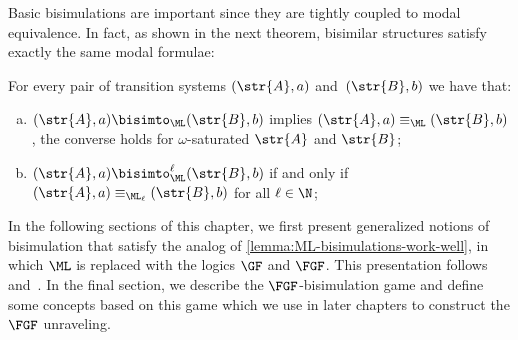 \noindent
Basic bisimulations are important since they are tightly coupled to modal equivalence.
In fact, as shown in the next theorem, bisimilar structures satisfy exactly the same modal formulae:
\begin{lemma}\label{lemma:ML-bisimulations-work-well}
For every pair of transition systems $(\str{A}, a)$ and~$(\str{B}, b)$ we have that:
\begin{enumerate}[(a)]
\item $(\str{A}, a) \bisimto_{\ML} (\str{B}, b)$ implies $(\str{A}, a) \equiv_{\ML} (\str{B}, b)$, the converse holds for $\omega$-saturated $\str{A}$ and $\str{B}$;
\item $(\str{A}, a) \bisimto_{\ML}^{\ell} (\str{B}, b)$ if and only if $(\str{A}, a) \equiv_{\ML_\ell} (\str{B}, b)$ for all $\ell \in \N$;
\end{enumerate}
\end{lemma}
In the following sections of this chapter, we first present generalized notions of bisimulation that satisfy the analog of \cref{lemma:ML-bisimulations-work-well}, in which $\ML$ is replaced with the logics $\GF$ and $\FGF$.
This presentation follows~\cite[Sec. 2.2.3]{Otto04} and~\cite[Sec. 2]{BednarczykJ22}.
In the final section, we describe the $\FGF$-bisimulation game and define some concepts based on this game which we use in later chapters to construct the $\FGF$ unraveling.

